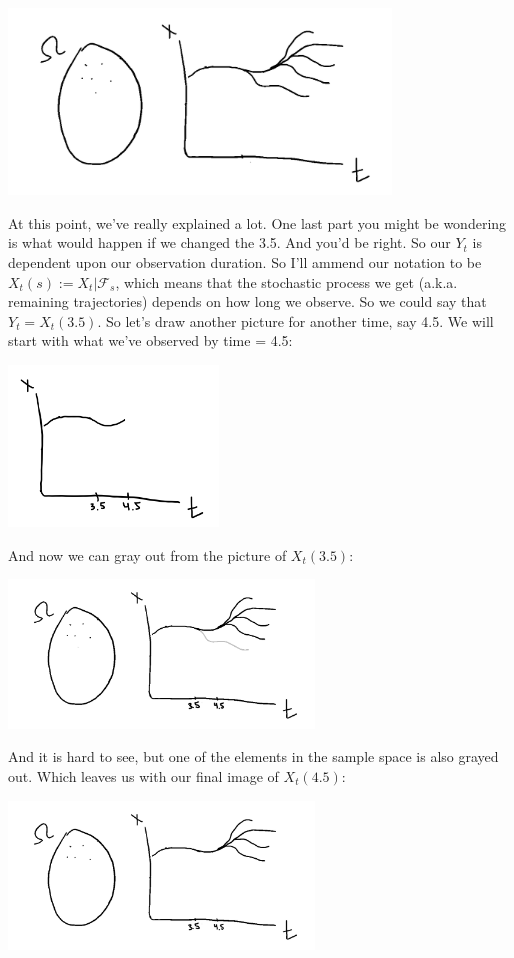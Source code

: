 \documentclass{article}
\begin{document}
\includegraphics[width=4in]{filtration_part_4.png}
\centering

At this point, we've really explained a lot.  One last part you might be wondering is what would happen if we changed the 3.5.  And you'd be right. So our $Y_t$ is dependent upon our observation duration. So I'll ammend our notation to be $X_t(s) := X_t | \mathcal{F}_{s}$, which means that the stochastic process we get (a.k.a. remaining trajectories) depends on how long we observe.  So we could say that $Y_t = X_t(3.5)$.  So let's draw another picture for another time, say 4.5. We will start with what we've observed by time = 4.5:

\includegraphics[width=2.2in]{filtration_4.5.png}
\centering

And now we can gray out from the picture of $X_t(3.5)$:

\includegraphics[width=3.2in]{Filtration_grayed_4.5.png}
\centering

And it is hard to see, but one of the elements in the sample space is also grayed out. Which leaves us with our final image of $X_t(4.5)$:

\includegraphics[width=3.2in]{final_4.5.png}
\centering
\end{document}
